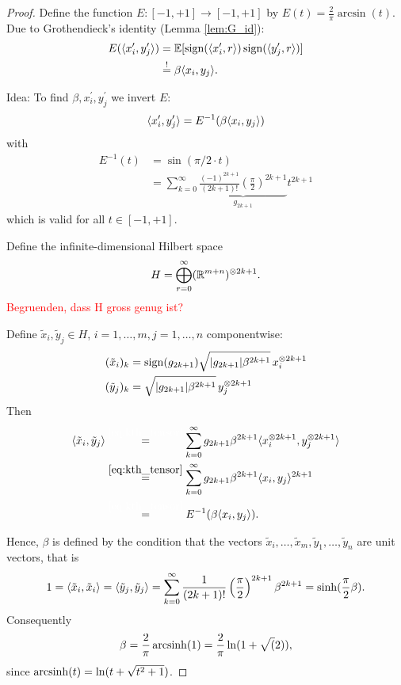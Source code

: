 \begin{proof}
	Define the function $E: [-1,+1] \to [-1,+1]$ by $E(t)=\frac{2}{\pi}\arcsin(t)$. Due to Grothendieck's identity (Lemma \ref{lem:G_id}):
	\begin{align*}
		E(\langle{x_i^\prime},{y_j^\prime}\rangle ) &= \mathbb{E}[\operatorname{sign}(\langle{x_i^\prime},{r}\rangle)\operatorname{sign}(\langle{y_j^\prime},{r}\rangle)]\\
		&\overset{!}{=}\beta \langle{x_i},{y_j}\rangle.
	\end{align*}
	
	\noindent Idea: To find $\beta,x_i^\prime,y_j^\prime$ we invert $E$:
	\[
		\langle{x_i^\prime},{y_j^\prime}\rangle = E^{-1} (\beta \langle{x_i},{y_j}\rangle)	
	\]
	with 
	\begin{align*}
		E^{-1}(t) &= \sin(\pi/2 \cdot t) \\
		&= \sum_{k=0}^\infty \underbrace{\frac{(-1)^{2k+1}}{(2k+1)!}\left(\frac{\pi}{2}\right)^{2k+1}}_{g_{2k+1}}  t^{2k+1}
	\end{align*}
	which is valid for all $t\in[-1,+1]$.
	
	Define the infinite-dimensional Hilbert space
	\begin{equation}
		H= \bigoplus_{r=0}^\infty (\mathbb{R}^{m+n})^{\otimes 2k+1}.
	\end{equation}
	\textcolor{red}{Begruenden, dass H gross genug ist?}
	
	Define $\tilde{x}_i, \tilde{y}_j\in H$, $i=1,\dots,m,j=1,\dots,n$ componentwise:
	\begin{align*}
		(\tilde{x}_i)_k &= \operatorname{sign}(g_{2k+1}) \sqrt{{\left|{g_{2k+1}}\right|}\beta^{2k+1}}\, x_i^{\otimes 2k+1} \\
		(\tilde{y}_j)_k &= \sqrt{{\left|{g_{2k+1}}\right|}\beta^{2k+1}} \,y_j^{\otimes 2k+1}
	\end{align*}
	Then 
	\begin{align*}
		\sclr{\tilde{x}_i}{\tilde{y}_j} &\overset{\textcolor{white}{\eqref*{eq:kth_tensor}}}{=} \sum_{k=0}^\infty g_{2k+1} \beta^{2k+1}\sclr{x_i^{\tensor 2k+1}}{y_j^{\tensor 2k+1}} \\
		&\overset{\eqref{eq:kth_tensor}}{=} \sum_{k=0}^\infty g_{2k+1} \beta^{2k+1} \sclr{x_i}{y_j}^{2k+1} \\
		&\overset{\textcolor{white}{\eqref*{eq:kth_tensor}}}{=} E^{-1}(\beta \sclr{x_i}{y_j}).
	\end{align*}
	
	Hence, $\beta$ is defined by the condition that the vectors $\tilde{x}_i,\dots,\tilde{x}_m,\tilde{y}_1,\dots,\tilde{y}_n$ are unit vectors, that is
	\[
		1 = \langle{\tilde{x}_i},{\tilde{x}_i}\rangle = \langle{\tilde{y}_j},{\tilde{y}_j}\rangle
		= \sum_{k=0}^\infty \frac{1}{(2k+1)!}\left(\frac{\pi}{2}\right)^{2k+1}\beta^{2k+1}=\sinh(\frac{\pi}{2}\beta).
	\]
	Consequently
	\[
		\beta = \frac{2}{\pi} \operatorname{arcsinh}(1) = \frac{2}{\pi}\ln(1+\sqrt(2)),	
	\]
	since $\operatorname{arcsinh} (t) = \ln(t+\sqrt{t^2+1})$.


\end{proof}
